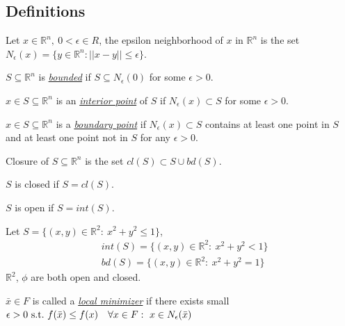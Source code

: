 \documentclass[11pt]{article}
\numberwithin{equation}{section}
\begin{document}
\subsection{Definitions}
\begin{definition}
    Let $x\in \mathbb{R}^n, \ 0<\epsilon \in R$, the epsilon neighborhood of $x$ in $\mathbb{R}^n$ is the set $N_\epsilon (x)=\{ y\in \mathbb{R}^n:||x-y||\leq \epsilon \}$.
\end{definition}
\begin{definition}
    $S \subseteq \mathbb{R}^n$ is \underline{\textit{bounded}} if $S \subseteq N_\epsilon(0)$ for some $\epsilon >0$.
\end{definition}
\begin{definition}
    $x\in S \subseteq \mathbb{R}^n$ is an \textit{\underline{interior point}} of $S$ if $N_\epsilon(x) \subset S$ for some $\epsilon >0$.
\end{definition}
\begin{definition}
    $x\in S \subseteq \mathbb{R}^n$ is a \underline{\textit{boundary point}} if $N_\epsilon(x) \subset S$ contains at least one point in $S$ and at least one point not in $S$ for any $\epsilon >0$.
\end{definition}
\begin{definition}
    Closure of $S \subseteq \mathbb{R}^n$ is the set $cl(S) \subset S \cup bd(S)$.
\end{definition}
\begin{definition}
    $S$ is closed if $S=cl(S)$.
\end{definition}
\begin{definition}
    $S$ is open if $S=int(S)$.
\end{definition}

\begin{example}
    Let $S=\{ (x,y)\in \mathbb{R}^2:\ x^2+y^2 \leq 1 \}$, \begin{align*}
        &int(S)=\{ (x,y)\in \mathbb{R}^2:\ x^2+y^2 < 1 \} \\
        &bd(S)=\{ (x,y)\in \mathbb{R}^2:\ x^2+y^2 = 1 \}
    \end{align*}
    $\mathbb{R}^2$, $\phi$ are both open and closed.
\end{example}

\begin{definition}
    $\bar{x}\in F$ is called a \underline{\textit{local minimizer}} if there exists small $\epsilon>0 \ \text{s.t.} \ f(\bar{x})\leq f(x) \quad \forall x \in F:\ x\in N_\epsilon(\bar{x})$
\end{definition}
\end{document}
